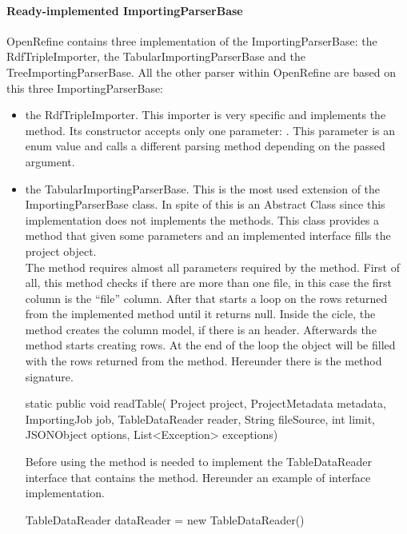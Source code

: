 \paragraph{Ready-implemented ImportingParserBase} OpenRefine contains three implementation of the ImportingParserBase: the RdfTripleImporter, the TabularImportingParserBase and the TreeImportingParserBase. All the other parser within OpenRefine are based on this three ImportingParserBase:
\begin{itemize}
	\item the RdfTripleImporter. This importer is very specific and implements the  method. Its constructor accepts only one parameter: . This parameter is an enum value and calls a different parsing method depending on the passed argument. 
	\item the TabularImportingParserBase. This is the most used extension of the ImportingParserBase class. In spite of this is an Abstract Class since this implementation does not implements the  methods. This class provides a  method that given some parameters and an implemented interface fills the project object.\\
	 The  method requires almost all parameters required by the  method. First of all, this method checks if there are more than one file, in this case the first column is the ``file'' column. After that starts a loop on the rows returned from the implemented  method until it returns null. Inside the cicle, the method creates the column model, if there is an header. Afterwards the method starts creating rows. At the end of the loop the  object will be filled with the rows returned from the  method. Hereunder there is the  method signature.
\begin{code}
static public void readTable(
        Project project,
        ProjectMetadata metadata,
        ImportingJob job,
        TableDataReader reader,
        String fileSource,
        int limit,
        JSONObject options,
        List<Exception> exceptions)
\end{code}
	  Before using the  method is needed to implement the TableDataReader interface that contains the  method. Hereunder an example of interface implementation.
	 \begin{code}
TableDataReader dataReader = new TableDataReader() {
}
\end{code}
\end{itemize}
